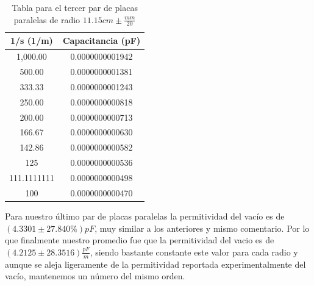 \documentclass[article,12pt]{elsarticle}
\begin{document}
\begin{table}[H]
\centering
\begin{tabular}{|c|c|}
\hline
\rowcolor[HTML]{C0C0C0} 
\textbf{1/s (1/m)}                 & \textbf{Capacitancia (pF)}             \\ \hline
\rowcolor[HTML]{FFFFFF} 
{\color[HTML]{000000} 1,000.00}    & {\color[HTML]{000000} 0.0000000001942} \\ \hline
\rowcolor[HTML]{FFFFFF} 
{\color[HTML]{000000} 500.00}      & {\color[HTML]{000000} 0.0000000001381} \\ \hline
\rowcolor[HTML]{FFFFFF} 
{\color[HTML]{000000} 333.33}      & {\color[HTML]{000000} 0.0000000001243} \\ \hline
\rowcolor[HTML]{FFFFFF} 
{\color[HTML]{000000} 250.00}      & {\color[HTML]{000000} 0.0000000000818} \\ \hline
\rowcolor[HTML]{FFFFFF} 
{\color[HTML]{000000} 200.00}      & {\color[HTML]{000000} 0.0000000000713} \\ \hline
\rowcolor[HTML]{FFFFFF} 
{\color[HTML]{000000} 166.67}      & {\color[HTML]{000000} 0.0000000000630} \\ \hline
\rowcolor[HTML]{FFFFFF} 
{\color[HTML]{000000} 142.86}      & {\color[HTML]{000000} 0.0000000000582} \\ \hline
\rowcolor[HTML]{FFFFFF} 
{\color[HTML]{000000} 125}         & {\color[HTML]{000000} 0.0000000000536} \\ \hline
\rowcolor[HTML]{FFFFFF} 
{\color[HTML]{000000} 111.1111111} & {\color[HTML]{000000} 0.0000000000498} \\ \hline
\rowcolor[HTML]{FFFFFF} 
{\color[HTML]{000000} 100}         & {\color[HTML]{000000} 0.0000000000470} \\ \hline
\end{tabular}
\caption{Tabla para el tercer par de placas paralelas de radio $11.15cm \pm \frac{mm}{20}$}
\end{table}

Para nuestro último par de placas paralelas la permitividad del vacío es de $(4.3301 \pm 27.840\%)pF$, muy similar a los anteriores y mismo comentario. Por lo que finalmente nuestro promedio fue que la permitividad del vacio es de $(4.2125 \pm 28.3516)\frac{pF}{m}$, siendo bastante constante este valor para cada radio y aunque se aleja ligeramente de la permitividad reportada experimentalmente del vacío, mantenemos un número del mismo orden.\\\\
\end{document}

